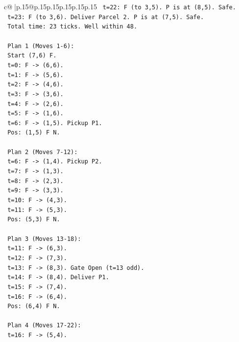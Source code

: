 \documentclass{article}
\begin{document}
{\begin{supertabular}{c@{$\;$}|p{.15\linewidth}@{}p{.15\linewidth}p{.15\linewidth}p{.15\linewidth}p{.15\linewidth}p{.15\linewidth}}
{{{\texttt{    t=22: F (to 3,5). P is at (8,5). Safe.} \\
\texttt{    t=23: F (to 3,6). Deliver Parcel 2. P is at (7,5). Safe.} \\
\texttt{    Total time: 23 ticks. Well within 48.} \\
\\ 
\texttt{    Plan 1 (Moves 1{-}6):} \\
\texttt{    Start (7,6) F.} \\
\texttt{    t=0: F {-}> (6,6).} \\
\texttt{    t=1: F {-}> (5,6).} \\
\texttt{    t=2: F {-}> (4,6).} \\
\texttt{    t=3: F {-}> (3,6).} \\
\texttt{    t=4: F {-}> (2,6).} \\
\texttt{    t=5: F {-}> (1,6).} \\
\texttt{    t=6: F {-}> (1,5). Pickup P1.} \\
\texttt{    Pos: (1,5) F N.} \\
\\ 
\texttt{    Plan 2 (Moves 7{-}12):} \\
\texttt{    t=6: F {-}> (1,4). Pickup P2.} \\
\texttt{    t=7: F {-}> (1,3).} \\
\texttt{    t=8: F {-}> (2,3).} \\
\texttt{    t=9: F {-}> (3,3).} \\
\texttt{    t=10: F {-}> (4,3).} \\
\texttt{    t=11: F {-}> (5,3).} \\
\texttt{    Pos: (5,3) F N.} \\
\\ 
\texttt{    Plan 3 (Moves 13{-}18):} \\
\texttt{    t=11: F {-}> (6,3).} \\
\texttt{    t=12: F {-}> (7,3).} \\
\texttt{    t=13: F {-}> (8,3). Gate Open (t=13 odd).} \\
\texttt{    t=14: F {-}> (8,4). Deliver P1.} \\
\texttt{    t=15: F {-}> (7,4).} \\
\texttt{    t=16: F {-}> (6,4).} \\
\texttt{    Pos: (6,4) F N.} \\
\\ 
\texttt{    Plan 4 (Moves 17{-}22):} \\
\texttt{    t=16: F {-}> (5,4).} \\
}}}
\end{supertabular}}
\end{document}
